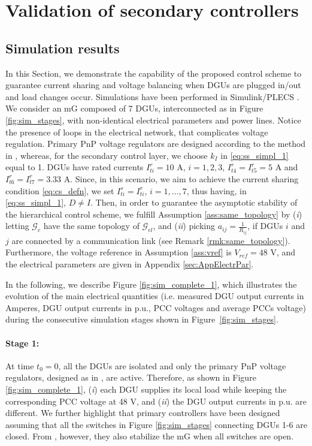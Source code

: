 \documentclass[a4paper]{article}
\theoremstyle{plain}
\begin{document}
\section{Validation of secondary controllers}
\subsection{Simulation results}
\label{sec:simulations}
In this Section, we demonstrate the capability of the proposed control
scheme to guarantee current sharing and voltage balancing when DGUs are plugged in/out and load changes occur. Simulations have been performed in Simulink/PLECS \cite{allmeling2013plecs}.
We consider an mG composed of 7 DGUs, interconnected as in Figure
	\ref{fig:sim_stages}, with non-identical electrical parameters and power lines. Notice the presence of loops in the electrical network, that complicates voltage regulation. Primary PnP voltage regulators are designed according to the method in \cite{tucci2015decentralized}, whereas, for the secondary control layer, we choose $k_I$ in \eqref{eq:ss_simpl_1} equal to 1. DGUs have rated currents ${I}_{ti}^r = 10$ A, $i = 1,2,3$, ${I}_{t4}^r = {I}_{t5}^r = 5$ A and ${I}_{t6}^r = {I}_{t7}^r = 3.33$ A. Since, in this scenario, we aim to achieve the current sharing condition \eqref{eq:cs_defn}, we set $I_{ti}^s = I_{ti}^r$, $i= 1,\dots,7$, thus having, in \eqref{eq:ss_simpl_1}, $D\neq I$. Then, in order to guarantee the asymptotic stability of the hierarchical control scheme, we fulfill Assumption \ref{ass:same_topology} by (\textit{i}) letting $\mathcal{G}_{c}$ have the same topology of $\mathcal{G}_{el}$, and (\textit{ii}) picking $a_{ij} = \frac{1}{R_{ij}}$, if DGUs $i$ and $j$ are connected by a communication link (see Remark \ref{rmk:same_topology}). Furthermore, the voltage reference in Assumption \ref{ass:vref} is $V_{ref} = 48$ V, and the electrical parameters are given in Appendix \ref{sec:AppElectrPar}.
 
In the following, we describe Figure
\ref{fig:sim_complete_1}, which illustrates the evolution of the main
electrical quantities (i.e. measured DGU output currents in Amperes, DGU output currents in p.u., PCC voltages and
average PCCs voltage) during the consecutive simulation
stages shown in Figure~\ref{fig:sim_stages}.

\paragraph{Stage 1:}
At time $t_0 = 0$, all the DGUs are isolated and only
the primary PnP voltage regulators, designed as in \cite{tucci2015decentralized}, are active. Therefore, as shown in
Figure \ref{fig:sim_complete_1}, (\textit{i}) each DGU supplies its local load while keeping the
corresponding PCC voltage at 48 V, and (\textit{ii}) the DGU output currents in p.u.
are different. We further highlight that primary controllers have been designed assuming that all the switches in Figure \ref{fig:sim_stages} connecting DGUs 1-6 are closed. From \cite{tucci2015decentralized}, however, they also stabilize the mG when all switches are open.
\end{document}
